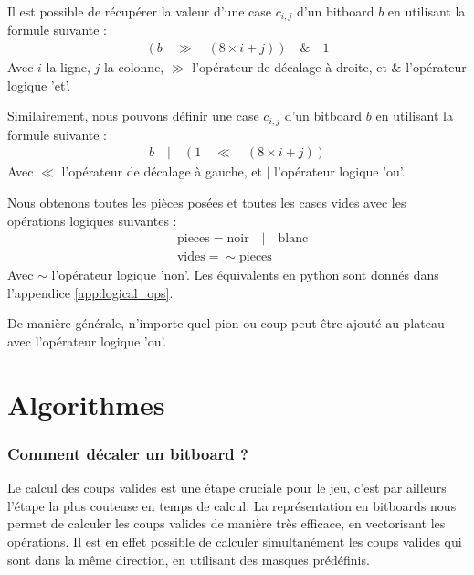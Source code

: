 Il est possible de récupérer la valeur d'une case $c_{i,j}$ d'un bitboard $b$ en utilisant la formule suivante : 
\begin{align*}
    (b\quad \gg\quad (8\times i+j))\quad \&\quad 1
\end{align*}
Avec $i$ la ligne, $j$ la colonne, $\gg$ l'opérateur de décalage à droite, et $\&$ l'opérateur logique 'et'.

Similairement, nous pouvons définir une case $c_{i,j}$ d'un bitboard $b$ en utilisant la formule suivante :
\begin{align*}
    b\quad |\quad (1\quad \ll\quad (8\times i+j))
\end{align*}
Avec $\ll$ l'opérateur de décalage à gauche, et $|$ l'opérateur logique 'ou'.

Nous obtenons toutes les pièces posées et toutes les cases vides avec les opérations logiques suivantes :
\begin{align*}
    &\text{pieces} = \text{noir} \quad | \quad \text{blanc} \\
    &\text{vides} = \sim \text{pieces}
\end{align*}
Avec $\sim$ l'opérateur logique 'non'. Les équivalents en python sont donnés dans l'appendice \ref{app:logical_ops}.

De manière générale, n'importe quel pion ou coup peut être ajouté au plateau avec l'opérateur logique 'ou'.


\section{Algorithmes}
\label{sec:algo}

\subsubsection{Comment décaler un bitboard ?}
\label{subsec:shift}
Le calcul des coups valides est une étape cruciale pour le jeu, c'est par ailleurs l'étape la plus couteuse en temps de calcul. La représentation en bitboards nous permet de calculer les coups valides de manière très efficace, en vectorisant les opérations. Il est en effet possible de calculer simultanément les coups valides qui sont dans la même direction, en utilisant des masques prédéfinis. 

